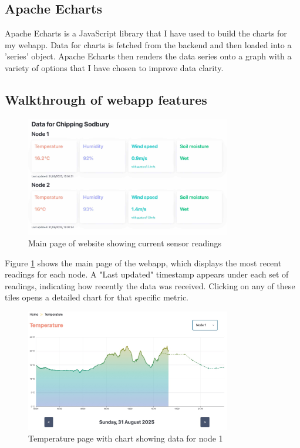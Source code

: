 \subsection{Apache Echarts}

Apache Echarts is a JavaScript library that I have used to build the charts for
my webapp. Data for charts is fetched from the backend and then loaded into a
'series' object. Apache Echarts then renders the data series onto a graph with a
variety of options that I have chosen to improve data clarity.

\subsection{Walkthrough of webapp features}\label{sec:walkthrough}

\begin{figure}[H]
    \centering
    \includegraphics[width=0.8\textwidth]{contents/part-3/fig3/main-page.jpg}
    \caption{Main page of website showing current sensor readings}
    \label{fig:main-page}
\end{figure}

Figure \ref{fig:main-page} shows the main page of the webapp, which displays the
most recent readings for each node. A "Last updated" timestamp appears under
each set of readings, indicating how recently the data was received. Clicking on
any of these tiles opens a detailed chart for that specific metric.

\begin{figure}[H]
    \centering
    \includegraphics[width=0.8\textwidth]{contents/part-3/fig3/temperature-node-one.jpg}
    \caption{Temperature page with chart showing data for node 1}
    \label{fig:temp-page}
\end{figure}

